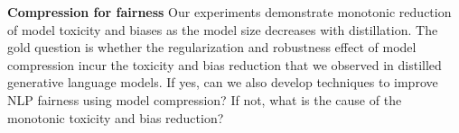 \noindent \textbf{Compression for fairness} \quad Our experiments demonstrate monotonic reduction of model toxicity and biases as the model size decreases with distillation. The gold question is whether the regularization and robustness effect of model compression incur the toxicity and bias reduction that we observed in distilled generative language models. If yes, can we also develop techniques to improve NLP fairness using model compression? If not, what is the cause of the monotonic toxicity and bias reduction?
